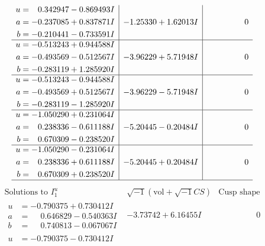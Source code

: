 \documentclass[1p]{elsarticle_modified}
\theoremstyle{definition}
\newcommand{\I}{\sqrt{-1}}
\begin{document}
$$\begin{array}{c|c|c}
\begin{aligned}
u &= \phantom{-}0.342947 - 0.869493 I \\
a &= -0.237085 + 0.837871 I \\
b &= -0.210441 - 0.733591 I\end{aligned}
 & -1.25330 + 1.62013 I & \phantom{-0.000000 } 0 \\ \hline\begin{aligned}
u &= -0.513243 + 0.944588 I \\
a &= -0.493569 - 0.512567 I \\
b &= -0.283119 + 1.285920 I\end{aligned}
 & -3.96229 + 5.71948 I & \phantom{-0.000000 } 0 \\ \hline\begin{aligned}
u &= -0.513243 - 0.944588 I \\
a &= -0.493569 + 0.512567 I \\
b &= -0.283119 - 1.285920 I\end{aligned}
 & -3.96229 - 5.71948 I & \phantom{-0.000000 } 0 \\ \hline\begin{aligned}
u &= -1.050290 + 0.231064 I \\
a &= \phantom{-}0.238336 - 0.611188 I \\
b &= \phantom{-}0.670309 - 0.238520 I\end{aligned}
 & -5.20445 - 0.20484 I & \phantom{-0.000000 } 0 \\ \hline\begin{aligned}
u &= -1.050290 - 0.231064 I \\
a &= \phantom{-}0.238336 + 0.611188 I \\
b &= \phantom{-}0.670309 + 0.238520 I\end{aligned}
 & -5.20445 + 0.20484 I & \phantom{-0.000000 } 0\\
 \hline 
 \end{array}$$\newpage$$\begin{array}{c|c|c}  
\text{Solutions to }I^u_{1}& \I (\text{vol} + \sqrt{-1}CS) & \text{Cusp shape}\\
 \hline 
\begin{aligned}
u &= -0.790375 + 0.730412 I \\
a &= \phantom{-}0.646829 - 0.540363 I \\
b &= \phantom{-}0.740813 - 0.067067 I\end{aligned}
 & -3.73742 + 6.16455 I & \phantom{-0.000000 } 0 \\ \hline\begin{aligned}
u &= -0.790375 - 0.730412 I \\

\end{aligned}
\end{array}$$
\end{document}
